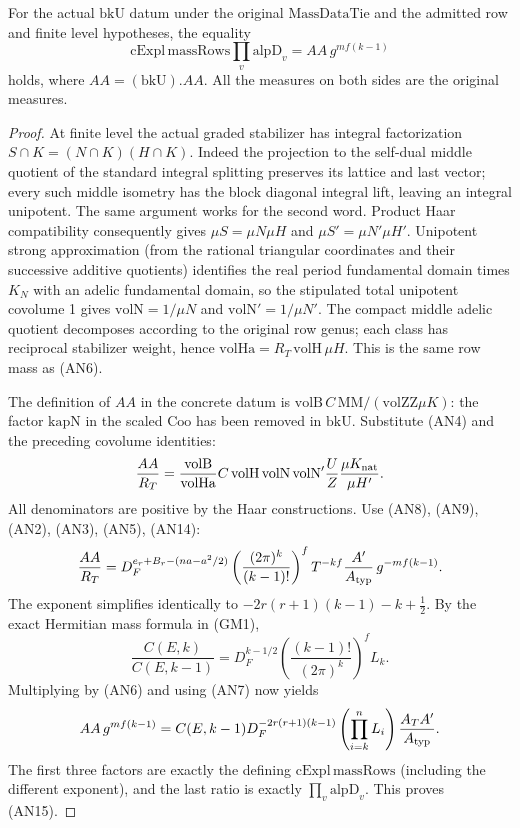 \begin{theorem}
\label{thm:flag-aa-normalization}
For the actual \(\mathrm{bkU}\) datum under the original
\(\mathrm{MassDataTie}\) and the admitted row and finite
level hypotheses, the equality
\[
 \boxed{\displaystyle
  \mathrm{cExpl}\,\mathrm{massRows}
           \prod_v\mathrm{alpD}_v
              =AA\,g^{mf(k-1)} }                       \tag{AN15}
\]
holds, where \(AA=(\mathrm{bkU}).AA\). All the measures on
both sides are the original measures.
\end{theorem}
\begin{proof}
At finite level the actual graded stabilizer has integral
factorization \(S\cap K=(N\cap K)(H\cap K)\).
Indeed the projection to the self-dual middle quotient of
the standard integral splitting preserves its lattice and
last vector; every such middle isometry has the block
diagonal integral lift, leaving an integral unipotent.
The same argument works for the second word. Product Haar
compatibility consequently gives \(\mu S=\mu N\mu H\) and
\(\mu S'=\mu N'\mu H'\). Unipotent strong approximation
(from the rational triangular coordinates and their successive
additive quotients) identifies the real period fundamental
domain times \(K_N\) with an adelic fundamental domain, so the
stipulated total unipotent covolume 1 gives
\(\mathrm{volN}=1/\mu N\) and \(\mathrm{volN}'=1/\mu N'\).
The compact middle adelic quotient decomposes according to
the original row genus; each class has reciprocal stabilizer
weight, hence
\(\mathrm{volHa}=R_T\,\mathrm{volH}\,\mu H\).
This is the same row mass as (AN6).

The definition of \(AA\) in the concrete datum is
\(\mathrm{volB}\,C\,\mathrm{MM}/(\mathrm{volZZ}\mu K)\):
the factor \(\mathrm{kapN}\) in the scaled \(\mathrm{Coo}\)
has been removed in \(\mathrm{bkU}\).
Substitute (AN4) and the preceding covolume identities:
\[
 \frac{AA}{R_T}
   =\frac{\mathrm{volB}}{\mathrm{volHa}}
     C\,\mathrm{volH}\,\mathrm{volN}\,\mathrm{volN}'
       \frac{U}{Z}\frac{\mu K_{\rm nat}}{\mu H'}.
\]
All denominators are positive by the Haar constructions.
Use (AN8), (AN9), (AN2), (AN3), (AN5), (AN14):
\[
 \frac{AA}{R_T}
   =D_F^{e_r+B_r-(na-a^2/2)}
       \left(\frac{(2\pi)^k}{(k-1)!}\right)^f T^{-kf}
         \frac{A'}{A_{\rm typ}}\,g^{-mf(k-1)} .
\]
The exponent simplifies identically to
\(-2r(r+1)(k-1)-k+\frac12\).
By the exact Hermitian mass formula in (GM1),
\[
  \frac{C(E,k)}{C(E,k-1)}
    =D_F^{k-1/2}\left(\frac{(k-1)!}{(2\pi)^k}\right)^f L_k .
\]
Multiplying by (AN6) and using (AN7) now yields
\[
 AA\,g^{mf(k-1)}
  =C(E,k-1)D_F^{-2r(r+1)(k-1)}
                 \left(\prod_{i=k}^n L_i\right)
                 \frac{A_T A'}{A_{\rm typ}} .
\]
The first three factors are exactly the defining
\(\mathrm{cExpl}\,\mathrm{massRows}\) (including the
different exponent), and the last ratio is exactly
\(\prod_v\mathrm{alpD}_v\). This proves (AN15).
\end{proof}


